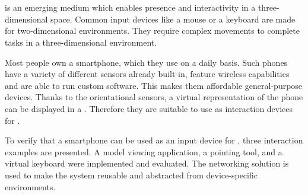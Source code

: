 \chapter{\abstractname}

 is an emerging medium which enables presence and interactivity in a three-dimensional space. Common input devices like a mouse or a keyboard are made for two-dimensional environments. They require complex movements to complete tasks in a three-dimensional environment.%

Most people own a smartphone, which they use on a daily basis. Such phones have a variety of different sensors already built-in, feature wireless capabilities and are able to run custom software. This makes them affordable general-purpose devices. Thanks to the orientational sensors, a virtual representation of the phone can be displayed in a . Therefore they are suitable to use as interaction devices for .

To verify that a smartphone can be used as an input device for , three interaction examples are presented. A model viewing application, a pointing tool, and a virtual keyboard were implemented and evaluated. The  networking solution is used to make the system reusable and abstracted from device-specific environments.